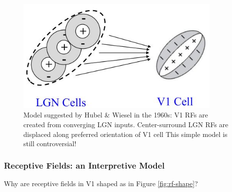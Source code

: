\documentclass[]{article}
\begin{document}
\begin{figure}[H]
	\caption[Model suggested by Hubel \& Wiesel in the 	1960s]{Model suggested by 	Hubel \& Wiesel in the 	1960s: V1 RFs are 	created from converging
		LGN inputs. Center-surround LGN RFs are displaced along
		preferred orientation of V1 cell This simple model is still controversial!}
	\includegraphics[width=0.9\textwidth]{mech-rf-v1}
\end{figure}

\subsubsection{Receptive Fields: an Interpretive Model}
Why are receptive fields in V1 shaped as in Figure \ref{fig:rf-shape}?
\end{document}
